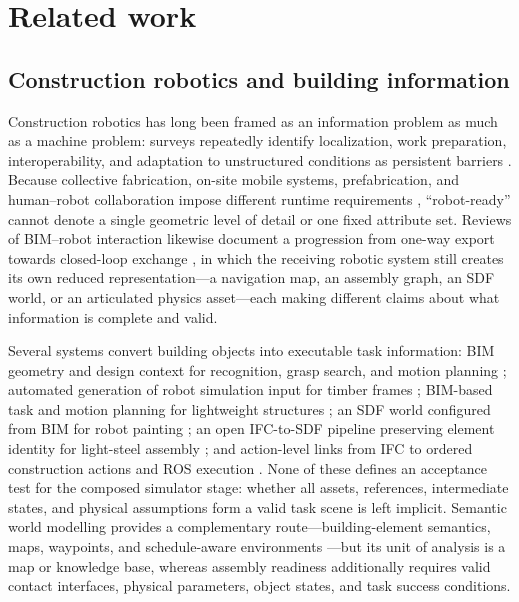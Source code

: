 \section{Related work}
\label{sec:related}

\subsection{Construction robotics and building information}

Construction robotics has long been framed as an information problem as much
as a machine problem: surveys repeatedly identify localization, work
preparation, interoperability, and adaptation to unstructured conditions as
persistent barriers
\cite{vaha2013automation,bock2015future,ardiny2015review,davila2019challenges,melenbrink2020onsite,xiao2022advancements}.
Because collective fabrication, on-site mobile systems, prefabrication, and
human--robot collaboration impose different runtime requirements
\cite{petersen2019collective,xu2026review,afaq2026steel}, ``robot-ready''
cannot denote a single geometric level of detail or one fixed attribute set.
Reviews of BIM--robot interaction likewise document a progression from
one-way export towards closed-loop exchange
\cite{zhang2022bimfar,anane2023interoperability,yue2025interactions,odugu2025review},
in which the receiving robotic system still creates its own reduced
representation---a navigation map, an assembly graph, an SDF world, or an
articulated physics asset---each making different claims about what
information is complete and valid.

Several systems convert building objects into executable task information:
BIM geometry and design context for recognition, grasp search, and motion
planning \cite{dawod2019recognition,ding2020brick}; automated generation of
robot simulation input for timber frames \cite{wong2022wood}; BIM-based task
and motion planning for lightweight structures \cite{gao2022assembly}; an
SDF world configured from BIM for robot painting \cite{kim2021bimrobot}; an
open IFC-to-SDF pipeline preserving element identity for light-steel
assembly \cite{zhu2023ifcsdf}; and action-level links from IFC to ordered
construction actions and ROS execution \cite{zhu2024rcan,oyediran2025fourdbim}.
None of these defines an acceptance test for the composed simulator stage:
whether all assets, references, intermediate states, and physical
assumptions form a valid task scene is left implicit. Semantic world
modelling provides a complementary route---building-element semantics,
maps, waypoints, and schedule-aware environments
\cite{kim2022semantic,moura2021localization,gopee2023navigation,bahreini2024ontology,amani2025pathfinding,chen2023inspection,zhao2024progress}---but
its unit of analysis is a map or knowledge base, whereas assembly readiness
additionally requires valid contact interfaces, physical parameters, object
states, and task success conditions.

